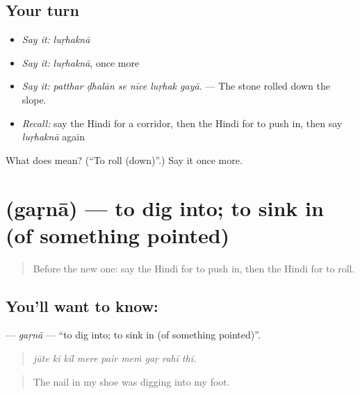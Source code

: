 \subsection*{Your turn}
\begin{itemize}
\raggedright
  \item \emph{Say it:} \emph{luṛhaknā}
  \item \emph{Say it:} \emph{luṛhaknā}, once more
  \item \emph{Say it:} \emph{patthar ḍhalān se nīce luṛhak gayā.} — The stone rolled down the slope.
  \item \emph{Recall:} say the Hindi for a corridor, then the Hindi for to push in, then say \emph{luṛhaknā} again
\end{itemize}

\begin{tcolorbox}[breakable,colback=teal!4,colframe=teal!35!black,title={Before you move on}]
What does  mean? (\textquotedblleft{}To roll (down)\textquotedblright{}.) Say it once more.
\end{tcolorbox}
\section[\texorpdfstring{\hi{गड़ना} (gaṛnā)}{गड़ना (gaṛnā)}]{ (gaṛnā) — to dig into; to sink in (of something pointed)}

\label{lesson:HI-C420-garnaintr}



\begin{quote}
Before the new one: say the Hindi for to push in, then the Hindi for to roll.
\end{quote}

\subsection*{You'll want to know: }
\textbf{} — \emph{gaṛnā} — \textquotedblleft{}to dig into; to sink in (of something pointed)\textquotedblright{}.

\begin{quote}
        
\end{quote}

\begin{quote}
\emph{jūte kī kīl mere pair meṁ gaṛ rahī thī.}
\end{quote}

\begin{quote}
The nail in my shoe was digging into my foot.
\end{quote}

